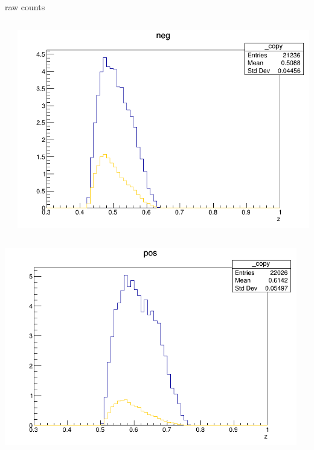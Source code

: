 \begin{frame}{raw counts}
\begin{columns}
\begin{column}[T]{0.25\textwidth}
\end{column}
\begin{column}[T]{0.25\textwidth}
\includegraphics[width = \textwidth]{results/yield/statistics/yield_x_Q2_z_0.50_5.500_0.50_neg.png}
\end{column}
\end{columns}
\begin{columns}
\begin{column}[T]{0.25\textwidth}
\includegraphics[width = \textwidth]{results/yield/statistics/yield_x_Q2_z_0.50_5.500_0.60_pos.png}
\end{column}
\begin{column}[T]{0.25\textwidth}

\end{column}
\end{columns}
\end{frame}
